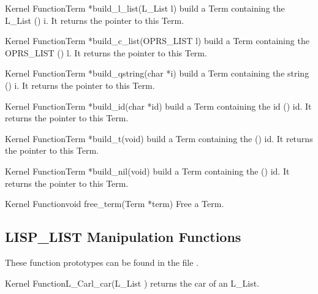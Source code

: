 \begin{typefn}{Kernel Function}{Term *}{build\_l\_list}{(L\_List l)} build a Term
containing the L\_List () i. It returns the pointer to this Term.
\end{typefn}

\begin{typefn}{Kernel Function}{Term *}{build\_c\_list}{(OPRS\_LIST l)} build a Term
containing the OPRS\_LIST () l. It returns the pointer to this Term.
\end{typefn}

\begin{typefn}{Kernel Function}{Term *}{build\_qstring}{(char *i)} build a Term
containing the string () i. It returns the pointer to this Term.
\end{typefn}

\begin{typefn}{Kernel Function}{Term *}{build\_id}{(char *id)} build a Term
containing the id () id. It returns the pointer to this Term.
\end{typefn}

\begin{typefn}{Kernel Function}{Term *}{build\_t}{(void)} build a Term
containing the () id. It returns the pointer to this Term.
\end{typefn}

\begin{typefn}{Kernel Function}{Term *}{build\_nil}{(void)} build a Term
containing the () id. It returns the pointer to this Term.
\end{typefn}

\begin{typefn}{Kernel Function}{void }{free\_term}{(Term *term)} Free a Term.
\end{typefn}

\subsection{LISP\_LIST Manipulation Functions}

These function prototypes can be found in the file
.

\begin{typefn}{Kernel Function}{L\_Car}{l\_car}{(L\_List )}
returns the car of an L\_List.
\end{typefn}

